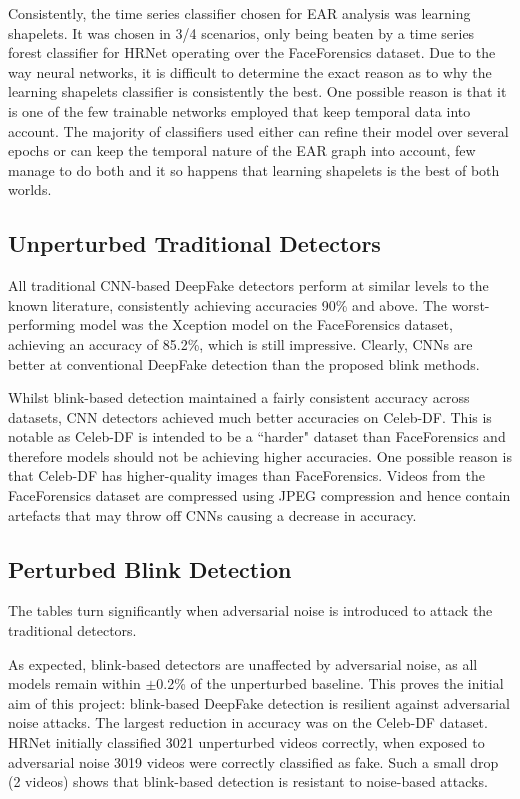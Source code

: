 Consistently, the time series classifier chosen for EAR analysis was learning shapelets. It was chosen in 3/4 scenarios, only being beaten by a time series forest classifier for HRNet operating over the FaceForensics dataset. Due to the way neural networks, it is difficult to determine the exact reason as to why the learning shapelets classifier is consistently the best. One possible reason is that it is one of the few trainable networks employed that keep temporal data into account. The majority of classifiers used either can refine their model over several epochs or can keep the temporal nature of the EAR graph into account, few manage to do both and it so happens that learning shapelets is the best of both worlds.

\subsection{Unperturbed Traditional Detectors}
\label{sec:un-trad-detect}

All traditional CNN-based DeepFake detectors perform at similar levels to the known literature, consistently achieving accuracies 90\% and above. The worst-performing model was the Xception model on the FaceForensics dataset, achieving an accuracy of 85.2\%, which is still impressive. Clearly, CNNs are better at conventional DeepFake detection than the proposed blink methods. 

Whilst blink-based detection maintained a fairly consistent accuracy across datasets, CNN detectors achieved much better accuracies on Celeb-DF. This is notable as Celeb-DF is intended to be a ``harder" dataset than FaceForensics\cite{li2020celeb} and therefore models should not be achieving higher accuracies. One possible reason is that Celeb-DF has higher-quality images than FaceForensics. Videos from the FaceForensics dataset are compressed using JPEG compression\cite{roessler2018faceforensics} and hence contain artefacts that may throw off CNNs causing a decrease in accuracy.

\subsection{Perturbed Blink Detection}
\label{sec:pert-blink}

The tables turn significantly when adversarial noise is introduced to attack the traditional detectors. 

As expected, blink-based detectors are unaffected by adversarial noise, as all models remain within $\pm$0.2\% of the unperturbed baseline. This proves the initial aim of this project: blink-based DeepFake detection is resilient against adversarial noise attacks. The largest reduction in accuracy was on the Celeb-DF dataset. HRNet initially classified 3021 unperturbed videos correctly, when exposed to adversarial noise 3019 videos were correctly classified as fake. Such a small drop (2 videos) shows that blink-based detection is resistant to noise-based attacks. 

